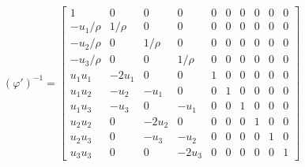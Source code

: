 \documentclass[11pt, reqno]{amsart}
\theoremstyle{definition}
\begin{document}
\begin{align}
  (\varphi')^{-1} = 
    \left[
    \begin{matrix}
      1         & 0          & 0         & 0      & 0 & 0 & 0 & 0 & 0 & 0 \\
      -u_1/\rho & 1/\rho     & 0         & 0      & 0 & 0 & 0 & 0 & 0 & 0 \\
      -u_2/\rho & 0          & 1/\rho    & 0      & 0 & 0 & 0 & 0 & 0 & 0 \\
      -u_3/\rho & 0          & 0         & 1/\rho & 0 & 0 & 0 & 0 & 0 & 0 \\
      u_1u_1    & -2u_1      & 0         & 0      & 1 & 0 & 0 & 0 & 0 & 0 \\
      u_1u_2    & -u_2       & -u_1      & 0      & 0 & 1 & 0 & 0 & 0 & 0 \\
      u_1u_3    & -u_3       & 0         & -u_1   & 0 & 0 & 1 & 0 & 0 & 0 \\
      u_2u_2    & 0          & -2 u_2    & 0      & 0 & 0 & 0 & 1 & 0 & 0 \\
      u_2u_3    & 0          & -u_3      & -u_2   & 0 & 0 & 0 & 0 & 1 & 0\\
      u_3u_3    & 0          & 0         & -2u_3  & 0 & 0 & 0 & 0 & 0 & 1
    \end{matrix}
  \right]
\end{align}



\end{document}
